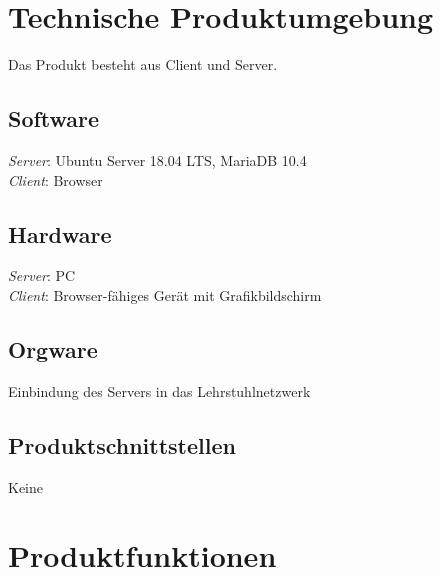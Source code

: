 \documentclass[12pt, a4paper]{article}
\begin{document}
\section{Technische Produktumgebung}
Das Produkt besteht aus Client und Server.
\subsection{Software}
\textit{Server}: Ubuntu Server 18.04 LTS, MariaDB 10.4 \\
\textit{Client}: Browser
\subsection{Hardware}
\textit{Server}: PC \\
\textit{Client}: Browser-fähiges Gerät mit Grafikbildschirm
\subsection{Orgware}
Einbindung des Servers in das Lehrstuhlnetzwerk
\subsection{Produktschnittstellen}
Keine

\pagebreak

\section{Produktfunktionen}
\end{document}
